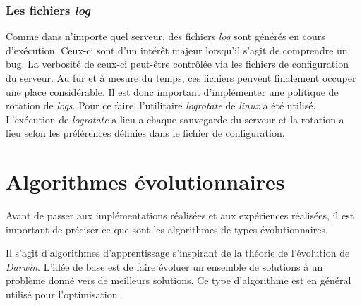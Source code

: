 \documentclass[a4paper, 11pt]{article}
\begin{document}
\subsubsection{Les fichiers \textit{log}}
Comme dans n'importe quel serveur, des fichiers \textit{log} sont générés en cours d'exécution. Ceux-ci sont d'un intérêt majeur lorsqu'il s'agit de comprendre un bug. La verbosité de ceux-ci peut-être contrôlée via les fichiers de configuration du serveur. Au fur et à mesure du temps, ces fichiers peuvent finalement occuper une place considérable. Il est donc important d'implémenter une politique de rotation de \textit{logs}. Pour ce faire, l'utilitaire \textit{logrotate} de \textit{linux} a été utilisé. L'exécution de \textit{logrotate} a lieu a chaque sauvegarde du serveur et la rotation a lieu selon les préférences définies dans le fichier de configuration. %



\section{Algorithmes évolutionnaires}
Avant de passer aux implémentations réalisées et aux expériences réalisées, il est important de préciser ce que sont les algorithmes de types évolutionnaires. 

Il s'agit d'algorithmes d'apprentissage s'inspirant de la théorie de l'évolution de \textit{Darwin}. L'idée de base est de faire évoluer un ensemble de solutions à un problème donné vers de meilleurs solutions. Ce type d'algorithme est en général utilisé pour l'optimisation.
\end{document}
